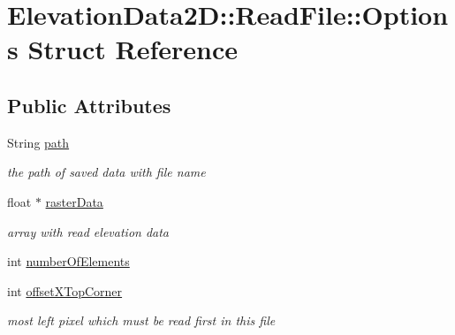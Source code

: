 \hypertarget{structElevationData2D_1_1ReadFile_1_1Options}{}\section{Elevation\+Data2D\+:\+:Read\+File\+:\+:Options Struct Reference}
\label{structElevationData2D_1_1ReadFile_1_1Options}
\subsection*{Public Attributes}
\begin{DoxyCompactItemize}
\item 
\mbox{\label{structElevationData2D_1_1ReadFile_1_1Options_a087190b9826cb5f51a8058037a4df5fa}} 
String \mbox{\hyperlink{structElevationData2D_1_1ReadFile_1_1Options_a087190b9826cb5f51a8058037a4df5fa}{path}}
\begin{DoxyCompactList}\small\item\em the path of saved data with file name \end{DoxyCompactList}\item 
\mbox{\label{structElevationData2D_1_1ReadFile_1_1Options_a86d0a0d5b7077f14c355a890785c61b8}} 
float $\ast$ \mbox{\hyperlink{structElevationData2D_1_1ReadFile_1_1Options_a86d0a0d5b7077f14c355a890785c61b8}{raster\+Data}}
\begin{DoxyCompactList}\small\item\em array with read elevation data \end{DoxyCompactList}\item 
int \mbox{\hyperlink{structElevationData2D_1_1ReadFile_1_1Options_a43a20cc28c6d9e708b2fbfcbb269d7ff}{number\+Of\+Elements}}
\item 
\mbox{\label{structElevationData2D_1_1ReadFile_1_1Options_a1f6dafab6c8711a78158a7727f05a79b}} 
int \mbox{\hyperlink{structElevationData2D_1_1ReadFile_1_1Options_a1f6dafab6c8711a78158a7727f05a79b}{offset\+X\+Top\+Corner}}
\begin{DoxyCompactList}\small\item\em most left pixel which must be read first in this file \end{DoxyCompactList}\item 

\end{DoxyCompactItemize}
